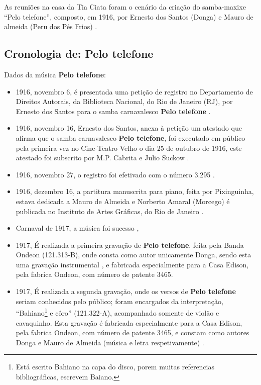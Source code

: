 As reuniões na casa da Tia Ciata foram o cenário da criação do samba-maxixe ``Pelo telefone'',
 composto, em 1916, 
por Ernesto dos Santos (Donga) e Mauro de almeida 
(Peru dos Pés Frios) \cite[pp. 34]{diniz2006almanaque} \cite[pp. 49]{diniz2008almanaque} 
\cite{musicapelotelefone} \cite[pp. 28]{diniz2003almanaque}.

\subsection{Cronologia de: Pelo telefone}
Dados da música \textbf{Pelo telefone}:
\begin{itemize}
\item 1916, novembro 6, é presentada uma petição de registro no
Departamento de Direitos Autorais, da Biblioteca Nacional, 
do Rio de Janeiro (RJ), 
por   Ernesto dos Santos  para o samba carnavalesco \textbf{Pelo telefone} \cite[pp. 599]{marcondes1977enciclopediav2}.
\item 1916, novembro 16, Ernesto dos Santos, 
anexa à petição um atestado que afirma que 
o samba carnavalesco \textbf{Pelo telefone}, 
foi executado em público pela primeira vez no
Cine-Teatro Velho o dia 25 de outubro de 1916,
este atestado foi subscrito por M.P. Cabrita e Julio Suckow \cite[pp. 599]{marcondes1977enciclopediav2}.
\item 1916, novembro 27, o registro foi efetivado com o número 3.295 \cite[pp. 599]{marcondes1977enciclopediav2}.
\item 1916, dezembro 16, a partitura manuscrita para piano, feita por Pixinguinha, 
estava dedicada a Mauro de Almeida e Norberto Amaral (Morcego) é
publicada no Instituto de Artes Gráficas, do Rio de Janeiro \cite[pp. 599]{marcondes1977enciclopediav2} \cite[pp 1]{revistausp1}.
\item Carnaval de 1917, a música foi sucesso   \cite[pp. 599]{marcondes1977enciclopediav2}  \cite[pp. 35]{diniz2006almanaque}, 

\item 1917, É realizada a primeira gravação de  \textbf{Pelo telefone}, feita pela Banda Ondeon (121.313-B), 
onde consta como autor unicamente Donga, 
sendo esta uma gravação instrumental \cite{musicapelotelefone} \cite[pp. 599]{marcondes1977enciclopediav2},
e  fabricada especialmente para a Casa Edison, pela fabrica Ondeon, com número de patente 3465.
\item 1917, É realizada a segunda gravação, onde os versos de \textbf{Pelo telefone} seriam conhecidos pelo público;
foram encargados da interpretação, ``Bahiano\footnote{Está 
escrito Bahiano na capa do disco, porem muitas referencias bibliográficas,
escrevem Baiano.} e côro'' (121.322-A), acompanhado somente de violão e cavaquinho. 
Esta gravação é fabricada especialmente para a Casa Edison, pela fabrica Ondeon, com número de patente 3465,  
e constam como autores Donga e Mauro de Almeida 
(música e letra respetivamente) \cite[pp. 599]{marcondes1977enciclopediav2} 
\cite[pp. 35]{diniz2006almanaque}  \cite{musicapelotelefone}.
\end{itemize}

